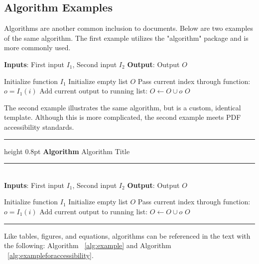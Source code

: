 \documentclass[./dissertation.tex]{subfiles}
\begin{document}
      \subsection{Algorithm Examples}
        Algorithms are another common inclusion to documents. Below are two examples of the same algorithm. The first example utilizes the "algorithm" package and is more commonly used. 
          \begin{algorithm}
          \caption{Algorithm Title}
          \label{alg:example}
          \textbf{Inputs}: First input $I_1$, Second input $I_2$
          \newline
          \textbf{Output}: Output $O$
          \begin{algorithmic}[1]
          \State Initialize function $I_1$
          \State Initialize empty list $O$
              \State Pass current index through function: $o = I_1(i)$
              \State Add current output to running list: $O \gets O \cup o$
          \EndFor
          \State \Return $O$
          \end{algorithmic}
          \end{algorithm}

        The second example illustrates the same algorithm, but is a custom, identical template. Although this is more complicated, the second example meets PDF accessibility standards.

          \begin{flushleft}
          \begin{minipage}{\textwidth}
          \singlespacing
          \hrule height 0.8pt
          \vspace{2pt}
          \tagmcend{}
          \noindent\textbf{Algorithm \thealgorithm} Algorithm Title \\[-9pt]
          \rule{\textwidth}{0.4pt}\\[-4pt]
          \label{alg:exampleforaccessibility}
          \noindent\textbf{Inputs}: First input $I_1$, Second input $I_2$
          \newline
          \noindent\textbf{Output}: Output $O$
          \begin{algorithmic}[1]
          \State Initialize function $I_1$
          \State Initialize empty list $O$
              \State Pass current index through function: $o = I_1(i)$
              \State Add current output to running list: $O \gets O \cup o$
          \EndFor
          \State \Return $O$
          \end{algorithmic}
          \vspace{2pt}
          \hrule
          \tagmcend{}
          \end{minipage}
          \end{flushleft}
        
        Like tables, figures, and equations, algorithms can be referenced in the text with the following: Algorithm ~\ref{alg:example} and Algorithm ~\ref{alg:exampleforaccessibility}.
\end{document}
